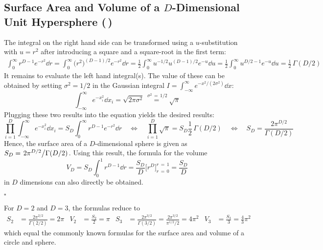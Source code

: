 \documentclass[11pt, a4paper]{scrartcl}
\newcommand{\qed}{\hfill\(\square\)}
\newcommand{\diffstar}{\texorpdfstring{\raisebox{-1pt}{\resizebox{!}{8pt}{\(\star\)}}}{*}}
\newcommand{\twostar}  {(\diffstar\,\diffstar)}
\begin{document}
		\subsection{Surface Area and Volume of a \(D\)-Dimensional Unit Hypersphere  \twostar}
			The integral on the right hand side can be transformed using a \(u\)-substitution with \( u = r^2 \) after introducing a square and a square-root in the first term:
			\begin{align}
				\int_0^\infty\! r^{D - 1} e^{-r^2} \dd{r}
					= \int_0^\infty\! \big(r^2\big)^{(D - 1) / 2} e^{-r^2} \dd{r}
					= \frac{1}{2} \int_0^\infty\! u^{-1/2} u^{(D - 1) / 2} e^{-u} \dd{u}
					= \frac{1}{2} \int_0^\infty\! u^{D/2 - 1} e^{-u} \dd{u}
					= \frac{1}{2} \, \Gamma(D / 2)
			\end{align}
			It remains to evaluate the left hand integral(s). The value of these can be obtained by setting \( \sigma^2 = 1/2 \) in the Gaussian integral \( I = \int_{-\infty}^{\infty}\! e^{-x^2 / (2 \sigma^2)} \dd{x} \):
			\begin{equation}
				\int_{-\infty}^{\infty}\! e^{-x_i^2} \dd{x_i}
					= \sqrt{2 \pi \sigma^2}
					\overset{\;\sigma^2 \,=\, 1/2}{=} \sqrt{\pi}
			\end{equation}
			Plugging these two results into the equation yields the desired results:
			\begin{equation}
				\prod_{i = 1}^{D} \int_{-\infty}^{\infty}\! e^{-x_i^2} \dd{x_i} = S_D \int_0^\infty\! r^{D - 1} e^{-r^2} \dd{r}
				\quad\iff\quad
				\prod_{i = 1}^{D} \sqrt{\pi} = S_D \frac{1}{2} \, \Gamma(D / 2)
				\quad\iff\quad
				S_D = \frac{2 \pi^{D/2}}{\Gamma(D / 2)}
			\end{equation}
			Hence, the surface area of a \(D\)-dimensional sphere is given as \( S_D = \flatfrac{2 \pi^{D/2}}{\Gamma(D / 2)} \). Using this result, the formula for the volume
			\begin{equation}
				V_D = S_D \int_0^1\! r^{D - 1} \dd{r} = \frac{S_D}{D} \big[ r^D \big]_{r \,=\, 0}^{r \,=\, 1} = \frac{S_D}{D}
			\end{equation}
			in \(D\) dimensions can also directly be obtained.

			\qed

			For \(D = 2\) and \(D = 3\), the formulas reduce to
			\begin{align}
				S_2 &= \frac{2 \pi^{2/2}}{\Gamma(2 / 2)} = 2 \pi &
				V_2 &= \frac{S_2}{2} = \pi &
				S_3 &= \frac{2 \pi^{3/2}}{\Gamma(3 / 2)} = \frac{2 \pi^{3/2}}{\pi^{1/2} / 2} = 4 \pi^2 &
				V_3 &= \frac{S_3}{3} = \frac{4}{3} \pi^2
			\end{align}
			which equal the commonly known formulas for the surface area and volume of a circle and sphere.
\end{document}
